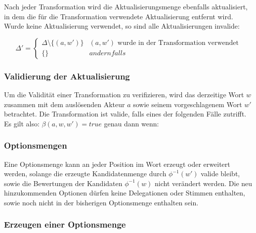 \documentclass[]{article}
\begin{document}
Nach jeder Transformation wird die Aktualisierungsmenge ebenfalls aktualisiert, in dem die für die Transformation verwendete Aktualisierung entfernt wird. Wurde keine Aktualisierung verwendet, so sind alle Aktualisierungen invalide:

\[ 
  \Delta' = 
  \begin{cases}
    \Delta\setminus \{ (a, w' )\} & (a,w')\text{ wurde in der Transformation verwendet} \\
    \{\} & andernfalls
  \end{cases}
\] 


\subsubsection*{Validierung der Aktualisierung}
Um die Validität einer Transformation zu verifizieren, wird das derzeitige Wort $w$ zusammen mit dem auslösenden Akteur $a$ sowie seinem vorgeschlagenem Wort $w'$ betrachtet. Die Transformation ist valide, falls eines der folgenden Fälle zutrifft.
Es gilt also: $\beta(a,w,w') = true$ genau dann wenn:

% 
% 
% 
% 




\subsubsection*{Optionsmengen}
Eine Optionsmenge kann an jeder Position im Wort erzeugt oder erweitert werden, solange die erzeugte Kandidatenmenge durch $\phi^{-1}(w')$ valide bleibt, sowie die Bewertungen der Kandidaten $\phi^{-1}(w)$ nicht verändert werden. Die neu hinzukommenden Optionen dürfen keine Delegationen oder Stimmen enthalten, sowie noch nicht in der bisherigen Optionsmenge enthalten sein.

\subsubsection*{Erzeugen einer Optionsmenge}
\end{document}
